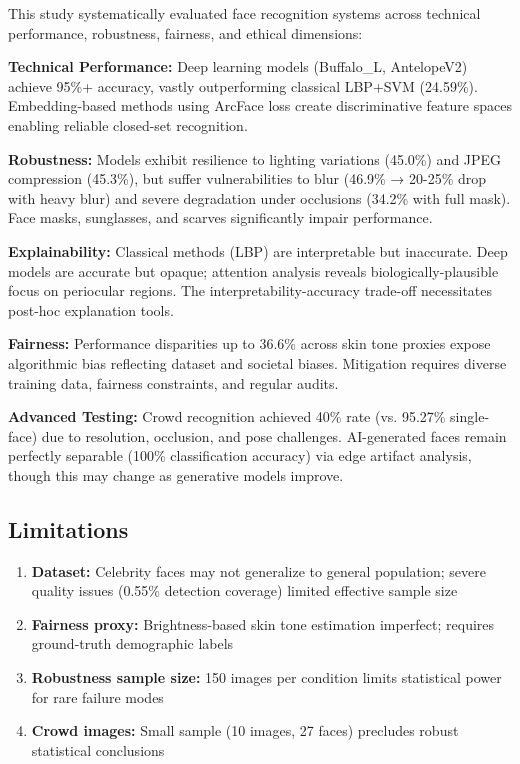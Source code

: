 \documentclass[11pt,a4paper]{article}
\begin{document}
This study systematically evaluated face recognition systems across technical performance, robustness, fairness, and ethical dimensions:

\textbf{Technical Performance:} Deep learning models (Buffalo\_L, AntelopeV2) achieve 95\%+ accuracy, vastly outperforming classical LBP+SVM (24.59\%). Embedding-based methods using ArcFace loss create discriminative feature spaces enabling reliable closed-set recognition.

\textbf{Robustness:} Models exhibit resilience to lighting variations (45.0\%) and JPEG compression (45.3\%), but suffer vulnerabilities to blur (46.9\% → 20-25\% drop with heavy blur) and severe degradation under occlusions (34.2\% with full mask). Face masks, sunglasses, and scarves significantly impair performance.

\textbf{Explainability:} Classical methods (LBP) are interpretable but inaccurate. Deep models are accurate but opaque; attention analysis reveals biologically-plausible focus on periocular regions. The interpretability-accuracy trade-off necessitates post-hoc explanation tools.

\textbf{Fairness:} Performance disparities up to 36.6\% across skin tone proxies expose algorithmic bias reflecting dataset and societal biases. Mitigation requires diverse training data, fairness constraints, and regular audits.

\textbf{Advanced Testing:} Crowd recognition achieved 40\% rate (vs. 95.27\% single-face) due to resolution, occlusion, and pose challenges. AI-generated faces remain perfectly separable (100\% classification accuracy) via edge artifact analysis, though this may change as generative models improve.

\subsection{Limitations}

\begin{enumerate}
    \item \textbf{Dataset:} Celebrity faces may not generalize to general population; severe quality issues (0.55\% detection coverage) limited effective sample size
    \item \textbf{Fairness proxy:} Brightness-based skin tone estimation imperfect; requires ground-truth demographic labels
    \item \textbf{Robustness sample size:} 150 images per condition limits statistical power for rare failure modes
    \item \textbf{Crowd images:} Small sample (10 images, 27 faces) precludes robust statistical conclusions
\end{enumerate}
\end{document}
